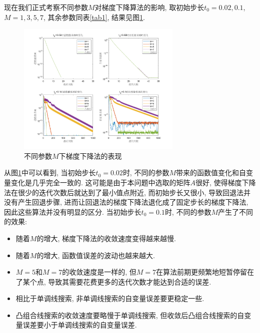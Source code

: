 \documentclass[UTF8]{ctexart}
\begin{document}


现在我们正式考察不同参数$M$对梯度下降算法的影响, 取初始步长$t_0=0.02,0.1$, $M=1,3,5,7$, 其余参数同表\ref{tab1}, 结果见图\ref{fig6}. 

\begin{figure}[htb]
    \centering
    \includegraphics[width=0.7\textwidth]{Q2-figure/6.png}
    \caption{不同参数$M$下梯度下降法的表现}\label{fig6}
\end{figure}

从图\ref{fig6}中可以看到, 当初始步长$t_0=0.02$时, 不同的参数$M$带来的函数值变化和自变量变化是几乎完全一致的. 这可能是由于本问题中选取的矩阵$A$很好, 使得梯度下降法在很少的迭代次数后就达到了最小值点附近, 而初始步长又很小, 导致回退法并没有产生回退步骤, 进而让回退法的梯度下降法退化成了固定步长的梯度下降法, 因此这些算法并没有明显的区分. 当初始步长$t_0=0.1$时, 不同的参数$M$产生了不同的效果: 
\begin{itemize}
    \item 随着$M$的增大, 梯度下降法的收敛速度变得越来越慢.
    \item 随着$M$的增大, 函数值误差的波动也越来越大.
    \item $M=5$和$M=7$的收敛速度是一样的, 但$M=7$在算法前期更频繁地短暂停留在了某个点, 导致其需要花费更多的迭代次数才能达到合适的误差. 
    \item 相比于单调线搜索, 非单调线搜索的自变量误差要更稳定一些. 
    \item 凸组合线搜索的收敛速度要略慢于单调线搜索, 但收敛后凸组合线搜索的自变量误差要小于单调线搜索的自变量误差. 
\end{itemize}
\end{document}
